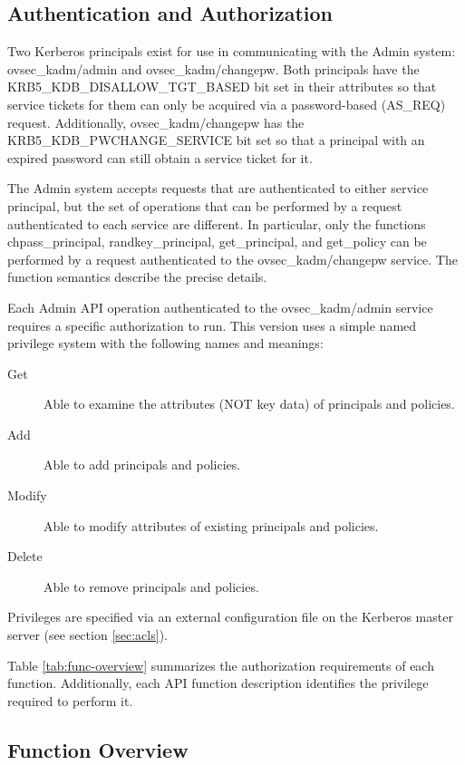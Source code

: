 \subsection{Authentication and Authorization}
\label{sec:auth}

Two Kerberos principals exist for use in communicating with the Admin
system: ovsec_kadm/admin and ovsec_kadm/changepw.  Both principals
have the KRB5_KDB_DISALLOW_TGT_BASED bit set in their attributes so
that service tickets for them can only be acquired via a
password-based (AS_REQ) request.  Additionally, ovsec_kadm/changepw
has the KRB5_KDB_PWCHANGE_SERVICE bit set so that a principal with an
expired password can still obtain a service ticket for it.

The Admin system accepts requests that are authenticated to either
service principal, but the set of operations that can be performed by
a request authenticated to each service are different.  In particular,
only the functions chpass_principal, randkey_principal, get_principal,
and get_policy can be performed by a request authenticated to the
ovsec_kadm/changepw service.  The function semantics describe the precise
details.

Each Admin API operation authenticated to the ovsec_kadm/admin service
requires a specific authorization to run.  This version uses a simple
named privilege system with the following names and meanings:

\begin{description}
\item[Get] Able to examine the attributes (NOT key data) of principals
and policies. 
\item[Add] Able to add principals and policies.
\item[Modify] Able to modify attributes of existing principals and policies.
\item[Delete] Able to remove principals and policies.
\end{description}

Privileges are specified via an external configuration file on the
Kerberos master server (see section \ref{sec:acls}).

Table \ref{tab:func-overview} summarizes the authorization
requirements of each function.  Additionally, each API function
description identifies the privilege required to perform it.

\subsection{Function Overview}

